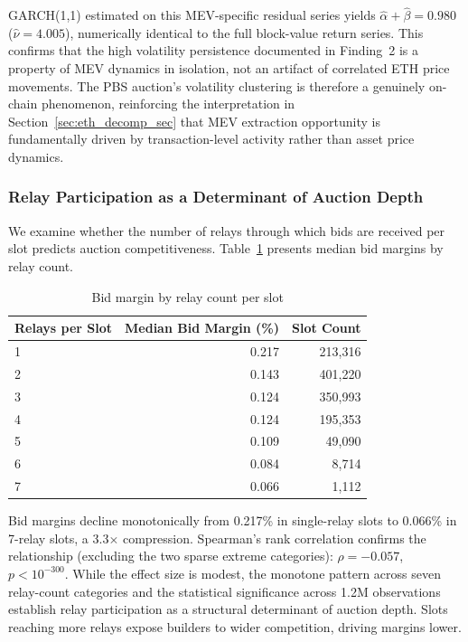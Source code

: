\documentclass[11pt]{article}
\begin{document}
GARCH(1,1) estimated on this MEV-specific residual series yields
$\hat\alpha + \hat\beta = 0.980$ ($\hat\nu = 4.005$), numerically identical
to the full block-value return series. This confirms that the high
volatility persistence documented in Finding~2 is a property of MEV
dynamics in isolation, not an artifact of correlated ETH price movements.
The PBS auction's volatility clustering is therefore a genuinely on-chain
phenomenon, reinforcing the interpretation in Section~\ref{sec:eth_decomp_sec}
that MEV
extraction opportunity is fundamentally driven by transaction-level
activity rather than asset price dynamics.

\subsubsection{Relay Participation as a Determinant of Auction Depth}
\label{sec:relay_depth}

We examine whether the number of relays through which bids are received per
slot predicts auction competitiveness. Table~\ref{tab:relay_margin} presents
median bid margins by relay count.

\begin{table}[h]
\centering
\caption{Bid margin by relay count per slot}
\label{tab:relay_margin}
\begin{tabular}{lrr}
\toprule
Relays per Slot & Median Bid Margin (\%) & Slot Count \\
\midrule
1 & 0.217 & 213,316 \\
2 & 0.143 & 401,220 \\
3 & 0.124 & 350,993 \\
4 & 0.124 & 195,353 \\
5 & 0.109 & 49,090 \\
6 & 0.084 & 8,714 \\
7 & 0.066 & 1,112 \\
\bottomrule
\end{tabular}
\end{table}

Bid margins decline monotonically from 0.217\% in single-relay slots to
0.066\% in 7-relay slots, a 3.3$\times$ compression. Spearman's rank
correlation confirms the relationship (excluding the two sparse extreme
categories): $\rho = -0.057$, $p < 10^{-300}$. While the effect size is
modest, the monotone pattern across seven relay-count categories and the
statistical significance across 1.2M observations establish relay
participation as a structural determinant of auction depth. Slots reaching
more relays expose builders to wider competition, driving margins lower.
\end{document}
